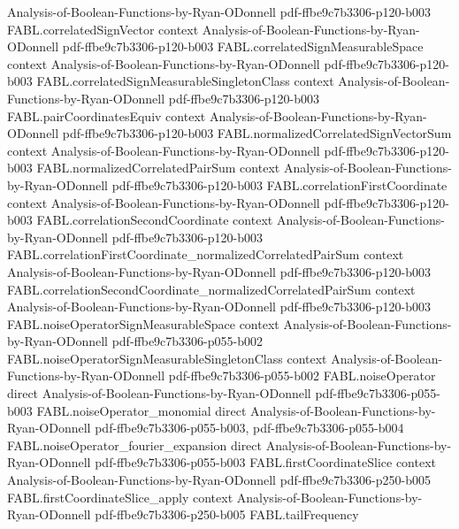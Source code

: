 \begin{theorem}
  {Analysis-of-Boolean-Functions-by-Ryan-ODonnell}
  {pdf-ffbe9c7b3306-p120-b003}
\proofstep
  {FABL.correlatedSignVector}
  {context}
  {Analysis-of-Boolean-Functions-by-Ryan-ODonnell}
  {pdf-ffbe9c7b3306-p120-b003}
\proofstep
  {FABL.correlatedSignMeasurableSpace}
  {context}
  {Analysis-of-Boolean-Functions-by-Ryan-ODonnell}
  {pdf-ffbe9c7b3306-p120-b003}
\proofstep
  {FABL.correlatedSignMeasurableSingletonClass}
  {context}
  {Analysis-of-Boolean-Functions-by-Ryan-ODonnell}
  {pdf-ffbe9c7b3306-p120-b003}
\proofstep
  {FABL.pairCoordinatesEquiv}
  {context}
  {Analysis-of-Boolean-Functions-by-Ryan-ODonnell}
  {pdf-ffbe9c7b3306-p120-b003}
\proofstep
  {FABL.normalizedCorrelatedSignVectorSum}
  {context}
  {Analysis-of-Boolean-Functions-by-Ryan-ODonnell}
  {pdf-ffbe9c7b3306-p120-b003}
\proofstep
  {FABL.normalizedCorrelatedPairSum}
  {context}
  {Analysis-of-Boolean-Functions-by-Ryan-ODonnell}
  {pdf-ffbe9c7b3306-p120-b003}
\proofstep
  {FABL.correlationFirstCoordinate}
  {context}
  {Analysis-of-Boolean-Functions-by-Ryan-ODonnell}
  {pdf-ffbe9c7b3306-p120-b003}
\proofstep
  {FABL.correlationSecondCoordinate}
  {context}
  {Analysis-of-Boolean-Functions-by-Ryan-ODonnell}
  {pdf-ffbe9c7b3306-p120-b003}
\proofstep
  {FABL.correlationFirstCoordinate_normalizedCorrelatedPairSum}
  {context}
  {Analysis-of-Boolean-Functions-by-Ryan-ODonnell}
  {pdf-ffbe9c7b3306-p120-b003}
\proofstep
  {FABL.correlationSecondCoordinate_normalizedCorrelatedPairSum}
  {context}
  {Analysis-of-Boolean-Functions-by-Ryan-ODonnell}
  {pdf-ffbe9c7b3306-p120-b003}
\proofstep
  {FABL.noiseOperatorSignMeasurableSpace}
  {context}
  {Analysis-of-Boolean-Functions-by-Ryan-ODonnell}
  {pdf-ffbe9c7b3306-p055-b002}
\proofstep
  {FABL.noiseOperatorSignMeasurableSingletonClass}
  {context}
  {Analysis-of-Boolean-Functions-by-Ryan-ODonnell}
  {pdf-ffbe9c7b3306-p055-b002}
\proofstep
  {FABL.noiseOperator}
  {direct}
  {Analysis-of-Boolean-Functions-by-Ryan-ODonnell}
  {pdf-ffbe9c7b3306-p055-b003}
\proofstep
  {FABL.noiseOperator_monomial}
  {direct}
  {Analysis-of-Boolean-Functions-by-Ryan-ODonnell}
  {pdf-ffbe9c7b3306-p055-b003,
    pdf-ffbe9c7b3306-p055-b004}
\proofstep
  {FABL.noiseOperator_fourier_expansion}
  {direct}
  {Analysis-of-Boolean-Functions-by-Ryan-ODonnell}
  {pdf-ffbe9c7b3306-p055-b003}
\proofstep
  {FABL.firstCoordinateSlice}
  {context}
  {Analysis-of-Boolean-Functions-by-Ryan-ODonnell}
  {pdf-ffbe9c7b3306-p250-b005}
\proofstep
  {FABL.firstCoordinateSlice_apply}
  {context}
  {Analysis-of-Boolean-Functions-by-Ryan-ODonnell}
  {pdf-ffbe9c7b3306-p250-b005}
\proofstep
  {FABL.tailFrequency}

\end{theorem}

